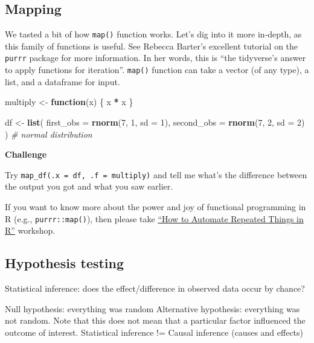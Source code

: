 \documentclass[
]{book}
\newenvironment{Shaded}{\begin{snugshade}}{\end{snugshade}}
\newcommand{\CommentTok}[1]{\textcolor[rgb]{0.56,0.35,0.01}{\textit{#1}}}
\newcommand{\ControlFlowTok}[1]{\textcolor[rgb]{0.13,0.29,0.53}{\textbf{#1}}}
\newcommand{\DataTypeTok}[1]{\textcolor[rgb]{0.13,0.29,0.53}{#1}}
\newcommand{\DecValTok}[1]{\textcolor[rgb]{0.00,0.00,0.81}{#1}}
\newcommand{\KeywordTok}[1]{\textcolor[rgb]{0.13,0.29,0.53}{\textbf{#1}}}
\newcommand{\NormalTok}[1]{#1}
\newcommand{\OperatorTok}[1]{\textcolor[rgb]{0.81,0.36,0.00}{\textbf{#1}}}
\newcommand{\StringTok}[1]{\textcolor[rgb]{0.31,0.60,0.02}{#1}}
\begin{document}
\hypertarget{mapping}{%
\subsection{Mapping}\label{mapping}}

We tasted a bit of how \texttt{map()} function works. Let's dig into it more in-depth, as this family of functions is useful. See Rebecca Barter's excellent tutorial on the \texttt{purrr} package for more information. In her words, this is ``the tidyverse's answer to apply functions for iteration''. \texttt{map()} function can take a vector (of any type), a list, and a dataframe for input.

\begin{Shaded}
\begin{Highlighting}[]
\NormalTok{multiply \textless{}{-}}\StringTok{ }\ControlFlowTok{function}\NormalTok{(x) \{}
\NormalTok{  x }\OperatorTok{*}\StringTok{ }\NormalTok{x}
\NormalTok{\}}

\NormalTok{df \textless{}{-}}\StringTok{ }\KeywordTok{list}\NormalTok{(}
  \DataTypeTok{first\_obs =} \KeywordTok{rnorm}\NormalTok{(}\DecValTok{7}\NormalTok{, }\DecValTok{1}\NormalTok{, }\DataTypeTok{sd =} \DecValTok{1}\NormalTok{),}
  \DataTypeTok{second\_obs =} \KeywordTok{rnorm}\NormalTok{(}\DecValTok{7}\NormalTok{, }\DecValTok{2}\NormalTok{, }\DataTypeTok{sd =} \DecValTok{2}\NormalTok{)}
\NormalTok{) }\CommentTok{\# normal distribution}
\end{Highlighting}
\end{Shaded}

\textbf{Challenge}

Try \texttt{map\_df(.x\ =\ df,\ .f\ =\ multiply)} and tell me what's the difference between the output you got and what you saw earlier.

If you want to know more about the power and joy of functional programming in R (e.g., \texttt{purrr::map()}), then please take \href{https://github.com/dlab-berkeley/R-functional-programming}{``How to Automate Repeated Things in R''} workshop.

\hypertarget{hypothesis-testing}{%
\subsection{Hypothesis testing}\label{hypothesis-testing}}

Statistical inference: does the effect/difference in observed data occur by chance?

Null hypothesis: everything was random
Alternative hypothesis: everything was not random. Note that this does not mean that a particular factor influenced the outcome of interest. Statistical inference != Causal inference (causes and effects)
\end{document}
